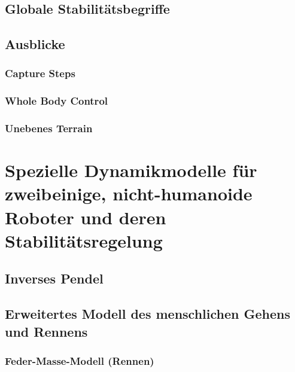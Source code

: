 \documentclass[a4paper, 11pt, accentcolor = tud3b]{tudreport}
\begin{document}
			\subsection{Globale Stabilitätsbegriffe} %

			\subsection{Ausblicke} %

				\subsubsection{Capture Steps} %

				\subsubsection{Whole Body Control} %

				\subsubsection{Unebenes Terrain} %

		\section{Spezielle Dynamikmodelle für zweibeinige, nicht-humanoide Roboter und deren Stabilitätsregelung} %

			\subsection{Inverses Pendel} %

			\subsection{Erweitertes Modell des menschlichen Gehens und Rennens} %

				\subsubsection{Feder-Masse-Modell (Rennen)} %
\end{document}
